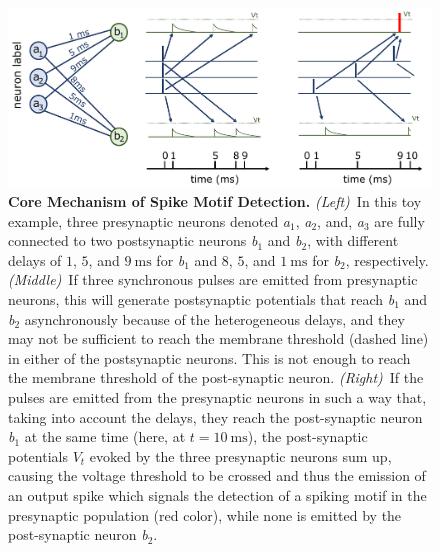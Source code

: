 \documentclass[runningheads]{llncs}
\newcommand{\ms}{\si{\milli\second}}%
\begin{document}
%
\begin{figure}[t]
  \centering
  \includegraphics[width=0.80\linewidth]{figures/izhikevich.pdf}%
    \caption{\textbf{Core Mechanism of Spike Motif Detection.} \textit{(Left)}~In this toy example, three presynaptic neurons denoted \textit{a}$_1$, \textit{a}$_2$, and, \textit{a}$_3$ are fully connected to two postsynaptic neurons \textit{b}$_1$ and \textit{b}$_2$, with different delays of $1$, $5$, and $9~\ms$ for \textit{b}$_1$ and $8$, $5$, and $1~\ms$ for \textit{b}$_2$, respectively. \textit{(Middle)}~If three synchronous pulses are emitted from presynaptic neurons, this will generate postsynaptic potentials that reach \textit{b}$_1$ and \textit{b}$_2$ asynchronously because of the heterogeneous delays, and they may not be sufficient to reach the membrane threshold (dashed line) in either of the postsynaptic neurons. This is not enough to reach the membrane threshold of the post-synaptic neuron.  \textit{(Right)}~If the pulses are emitted from the presynaptic neurons in such a way that, taking into account the delays, they reach the post-synaptic neuron \textit{b}$_1$ at the same time (here, at $t=10~\ms$), the post-synaptic potentials $V_t$ evoked by the three presynaptic neurons sum up, causing the voltage threshold to be crossed and thus the emission of an output spike which signals the detection of a spiking motif in the presynaptic population (red color), while none is emitted by the post-synaptic neuron \textit{b}$_2$.
     }
  \label{fig:izhikevich}
\end{figure}
\end{document}
